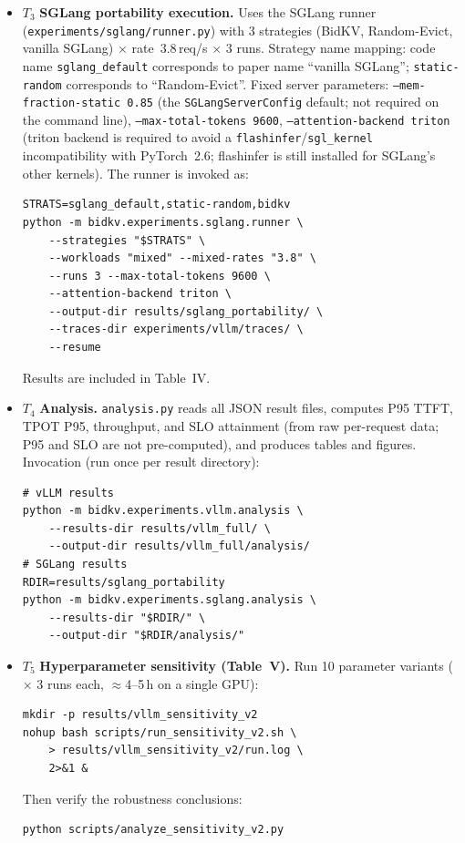 \documentclass[conference]{IEEEtran}
\begin{document}
\begin{itemize}
  \item $T_3$ \textbf{SGLang portability execution.}
    Uses the SGLang runner (\texttt{experiments/sglang/runner.py}) with
    3 strategies (BidKV, Random-Evict, vanilla SGLang) $\times$
    rate~3.8\,req/s $\times$ 3 runs.
    Strategy name mapping: code name \texttt{sglang\_default} corresponds
    to paper name ``vanilla SGLang''; \texttt{static-random} corresponds
    to ``Random-Evict''.
    Fixed server parameters: \texttt{--mem-fraction-static~0.85}
    (the \texttt{SGLangServerConfig} default; not required on the command line),
    \texttt{--max-total-tokens~9600}, \texttt{--attention-backend~triton}
    (triton backend is required to avoid a \texttt{flashinfer}/\texttt{sgl\_kernel}
    incompatibility with PyTorch~2.6; flashinfer is still installed for
    SGLang's other kernels).
    The runner is invoked as:
    \begin{Verbatim}
STRATS=sglang_default,static-random,bidkv
python -m bidkv.experiments.sglang.runner \
    --strategies "$STRATS" \
    --workloads "mixed" --mixed-rates "3.8" \
    --runs 3 --max-total-tokens 9600 \
    --attention-backend triton \
    --output-dir results/sglang_portability/ \
    --traces-dir experiments/vllm/traces/ \
    --resume
\end{Verbatim}

    Results are included in Table~IV.

  \item $T_4$ \textbf{Analysis.}
    \texttt{analysis.py} reads all JSON result files, computes P95 TTFT,
    TPOT P95, throughput, and SLO attainment (from raw per-request data;
    P95 and SLO are not pre-computed), and produces tables and figures.
    Invocation (run once per result directory):
    \begin{Verbatim}
# vLLM results
python -m bidkv.experiments.vllm.analysis \
    --results-dir results/vllm_full/ \
    --output-dir results/vllm_full/analysis/
# SGLang results
RDIR=results/sglang_portability
python -m bidkv.experiments.sglang.analysis \
    --results-dir "$RDIR/" \
    --output-dir "$RDIR/analysis/"
    \end{Verbatim}

  \item $T_5$ \textbf{Hyperparameter sensitivity (Table~V).}
    Run 10 parameter variants ($\times$ 3 runs each,
    $\approx$4--5\,h on a single GPU):
    \begin{Verbatim}
mkdir -p results/vllm_sensitivity_v2
nohup bash scripts/run_sensitivity_v2.sh \
    > results/vllm_sensitivity_v2/run.log \
    2>&1 &
    \end{Verbatim}
    Then verify the robustness conclusions:
    \begin{Verbatim}
python scripts/analyze_sensitivity_v2.py
    \end{Verbatim}

\end{itemize}
\end{document}
